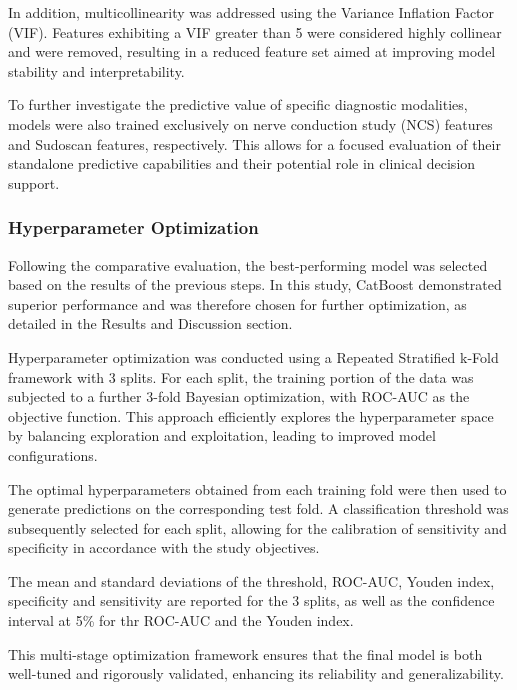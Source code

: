 \documentclass[pdflatex,sn-vancouver-num]{sn-jnl}
\begin{document}
In addition, multicollinearity was addressed using the Variance Inflation Factor (VIF). Features exhibiting a VIF greater than 5 were considered highly collinear and were removed, resulting in a reduced feature set aimed at improving model stability and interpretability.

To further investigate the predictive value of specific diagnostic modalities, models were also trained exclusively on nerve conduction study (NCS) features and Sudoscan features, respectively. This allows for a focused evaluation of their standalone predictive capabilities and their potential role in clinical decision support.

\subsubsection{Hyperparameter Optimization}
Following the comparative evaluation, the best-performing model was selected based on the results of the previous steps. In this study, CatBoost demonstrated superior performance and was therefore chosen for further optimization, as detailed in the Results and Discussion section.

Hyperparameter optimization was conducted using a Repeated Stratified k-Fold framework with 3 splits. For each split, the training portion of the data was subjected to a further 3-fold Bayesian optimization, with ROC-AUC as the objective function. This approach efficiently explores the hyperparameter space by balancing exploration and exploitation, leading to improved model configurations.

The optimal hyperparameters obtained from each training fold were then used to generate predictions on the corresponding test fold. A classification threshold was subsequently selected for each split, allowing for the calibration of sensitivity and specificity in accordance with the study objectives.

The mean and standard deviations of the threshold, ROC-AUC, Youden index, specificity and sensitivity are reported for the 3 splits, as well as the confidence interval at 5\% for thr ROC-AUC and the Youden index.

This multi-stage optimization framework ensures that the final model is both well-tuned and rigorously validated, enhancing its reliability and generalizability.
\end{document}

